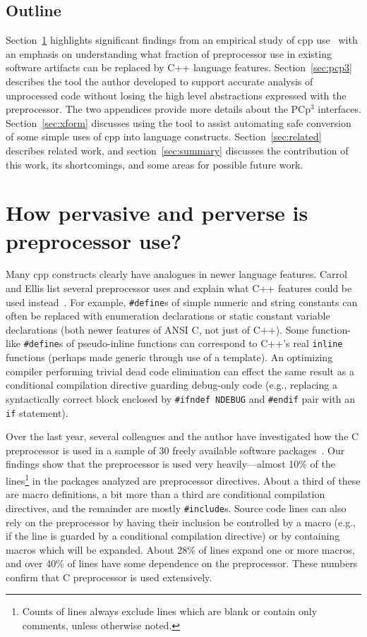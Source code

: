 \documentclass{article}
\newcommand{\pcp}{\mbox{\textsf{PCp}$^3$}}
\newcommand{\Cpp}{\mbox{\textsf{cpp}}}
\newcommand{\CPP}{\mbox{\textsf{C++}}}
\newcommand{\C}{\mbox{\textsf{C}}}
\newcommand{\ppd}[1]{\texttt{\##1}}
\newcommand{\eg}{e.g.,}
\begin{document}
\subsection{Outline}

Section~\ref{sec:feasibility} highlights significant findings from an
empirical study of \Cpp{} use~\cite{EmpCpp} with an emphasis on
understanding what fraction of preprocessor use in existing software
artifacts can be replaced by \CPP{} language features.
Section~\ref{sec:pcp3} describes the tool the author developed to
support accurate analysis of unprocessed code without losing the high
level abstractions expressed with the preprocessor.  The two appendices
provide more details about the \pcp{} interfaces.
Section~\ref{sec:xform} discusses using the tool to assist automating
safe conversion of some simple uses of \Cpp{} into language constructs.
Section~\ref{sec:related} describes related work, and
section~\ref{sec:summary} discusses the contribution of this work, its
shortcomings, and some areas for possible future work.


\section{How pervasive and perverse is preprocessor use?}
\label{sec:feasibility}
Many \Cpp{} constructs clearly have analogues in newer language
features.  Carrol and Ellis list several preprocessor uses and explain
what \CPP{} features could be used instead~\cite{Carroll95}. For
example, \ppd{define}s of simple numeric and string constants can often
be replaced with enumeration declarations or static constant variable
declarations (both newer features of ANSI \C{}, not just of \CPP{}).
Some function-like \ppd{define}s of pseudo-inline functions can
correspond to \CPP{}'s real \texttt{inline} functions (perhaps made
generic through use of a template).  An optimizing compiler performing
trivial dead code elimination can effect the same result as a
conditional compilation directive guarding debug-only code (e.g.,
replacing a syntactically correct block enclosed by \texttt{\ppd{ifndef}
  NDEBUG} and \ppd{endif} pair with an \texttt{if} statement).

Over the last year, several colleagues and the author have investigated
how the \C{} preprocessor is used in a sample of 30 freely available
software packages~\cite{EmpCpp}.  Our findings show that the
preprocessor is used very heavily---almost 10\% of the
lines\footnote{Counts of lines always exclude lines which are blank or
  contain only comments, unless otherwise noted.} in the packages
analyzed are preprocessor directives.  About a third of these are macro
definitions, a bit more than a third are conditional compilation
directives, and the remainder are mostly \ppd{include}s.  Source code
lines can also rely on the preprocessor by having their inclusion be
controlled by a macro (\eg{} if the line is guarded by a conditional
compilation directive) or by containing macros which will be expanded.
About 28\% of lines expand one or more macros, and over 40\% of lines have some
dependence on the preprocessor.  These numbers confirm that \C{}
preprocessor is used extensively.
\end{document}
